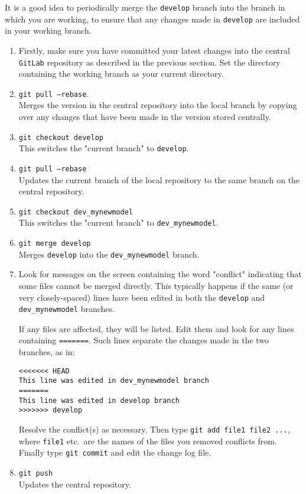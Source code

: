 \documentclass[11pt,a4paper]{report}
\begin{document}
It is a good idea to periodically merge the \texttt{develop} branch into the branch in which you are working, to ensure that any changes made in \texttt{develop} are included in your working branch.
\begin{enumerate}

\item Firstly, make sure you have committed your latest changes into the
  central \texttt{GitLab} repository as described in the previous section.  Set the directory containing the working branch as your current directory.

\item \texttt{git pull --rebase}.  \\
Merges the version in the central repository into the local branch by copying over any changes that have been made in the version stored centrally.

\item \texttt{git checkout develop}  \\
This switches the "current branch" to \texttt{develop}.

\item \texttt{git pull --rebase} \\
Updates the current branch of the local repository to the same branch on the central repository.

\item \texttt{git checkout dev\_mynewmodel}  \\
This switches the "current branch" to \texttt{dev\_mynewmodel}.

\item \texttt{git merge develop} \\
Merges \texttt{develop} into the \texttt{dev\_mynewmodel} branch.

\item Look for messages on the screen containing the word "conflict" indicating that some files cannot be merged directly. This typically happens if the
  same (or very closely-spaced) lines have been edited in both the
  \texttt{develop} and \texttt{dev\_mynewmodel} branches.

  If any files are affected, they will be listed.  Edit them and look for any lines containing  \texttt{=======}. Such lines separate the changes made in the two branches, as in:
\begin{verbatim}
<<<<<<< HEAD
This line was edited in dev_mynewmodel branch
=======
This line was edited in develop branch
>>>>>>> develop
\end{verbatim}
  Resolve the conflict(s) as necessary. Then type \texttt{git add file1 file2 ...}, where
  \texttt{file1} etc.\ are the names of the files you removed conflicts
  from. Finally type \texttt{git commit} and edit the change log file.

\item \texttt{git push} \\
Updates the central repository.

\end{enumerate}
\end{document}
